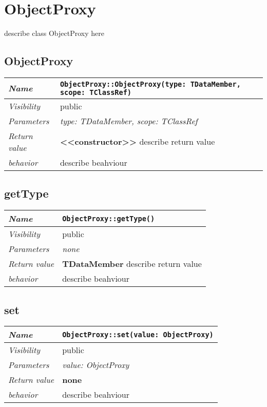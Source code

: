 \chapter{ObjectProxy}
describe class ObjectProxy here
\section{ObjectProxy}
\begin{longtable}{p{3cm} @{\hskip 1cm} p{12cm}}
 \hline
\textit{Name} & \texttt{ObjectProxy::ObjectProxy(type: TDataMember, scope: TClassRef)}\\
\hline
 \textit{Visibility} & public\\
\hline
\textit{Parameters} & \textit{type: TDataMember, scope: TClassRef}\\
\hline
\textit{Return value} & \textbf{ <<constructor>>} describe return value\\
  \hline
 \textit{behavior} & describe beahviour \\
\hline
\end{longtable} \pagebreak
 \section{getType}
\begin{longtable}{p{3cm} @{\hskip 1cm} p{12cm}}
 \hline
\textit{Name} & \texttt{ObjectProxy::getType()}\\
\hline
 \textit{Visibility} & public\\
\hline
\textit{Parameters} & \textit{none}\\
\hline
\textit{Return value} & \textbf{ TDataMember} describe return value\\
  \hline
 \textit{behavior} & describe beahviour \\
\hline
\end{longtable} \pagebreak
 \section{set}
\begin{longtable}{p{3cm} @{\hskip 1cm} p{12cm}}
 \hline
\textit{Name} & \texttt{ObjectProxy::set(value: ObjectProxy)}\\
\hline
 \textit{Visibility} & public\\
\hline
\textit{Parameters} & \textit{value: ObjectProxy}\\
\hline
\textit{Return value} & \textbf{none}\\
  \hline
 \textit{behavior} & describe beahviour \\
\hline
\end{longtable} \pagebreak

